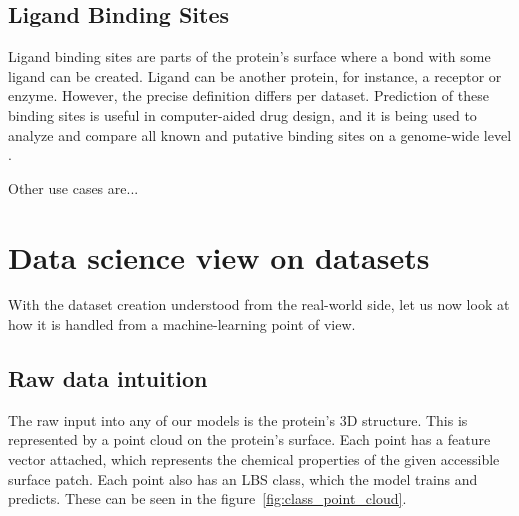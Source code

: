 

\subsection{Ligand Binding Sites}

Ligand binding sites are parts of the protein's surface where a bond with some ligand can be created. Ligand can be another protein, for instance, a receptor or enzyme. However, the precise definition differs per dataset. Prediction of these binding sites is useful in computer-aided drug design, and it is being used to analyze and compare all known and putative binding sites on a genome-wide level \cite{P2RANK}.

Other use cases are...



\section{Data science view on datasets}

With the dataset creation understood from the real-world side, let us now look at how it is handled from a machine-learning point of view. 

\subsection{Raw data intuition}

The raw input into any of our models is the protein's 3D structure. This is represented by a point cloud on the protein's surface. Each point has a feature vector attached, which represents the chemical properties of the given accessible surface patch. Each point also has an LBS class, which the model trains and predicts. These can be seen in the figure~\ref{fig:class_point_cloud}.


